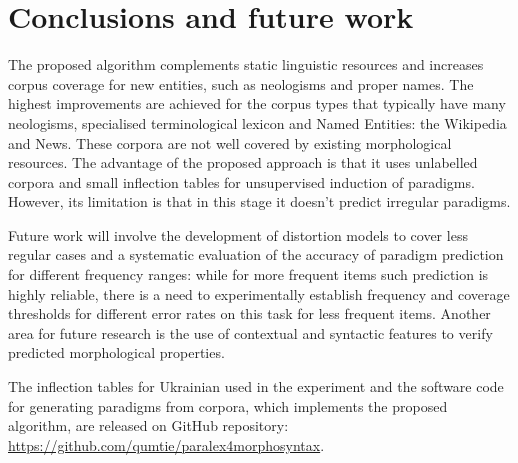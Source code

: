 \documentclass[11pt,a4paper]{article}
\begin{document}
\section{Conclusions and future work}
\label{sec:Conclusions}


The proposed algorithm complements static linguistic resources and increases corpus coverage for new entities, such as neologisms and proper names. The highest improvements are achieved for the corpus types that typically have many neologisms, specialised terminological lexicon and Named Entities: the Wikipedia and News. These corpora are not well covered by existing morphological resources. The advantage of the proposed approach is that it uses unlabelled corpora and small inflection tables for unsupervised induction of paradigms. However, its limitation is that in this stage it doesn't predict irregular paradigms. 

Future work will involve the development of distortion models to cover less regular cases and a systematic evaluation of the accuracy of paradigm prediction for different frequency ranges: while for more frequent items such prediction is highly reliable, there is a need to experimentally establish frequency and coverage thresholds for different error rates on this task for less frequent items. Another area for future research is the use of contextual and syntactic features to verify predicted morphological properties.

The inflection tables for Ukrainian used in the experiment and the software code for generating paradigms from corpora, which implements the proposed algorithm, are released on GitHub repository: \url{https://github.com/qumtie/paralex4morphosyntax}. 



\end{document}
